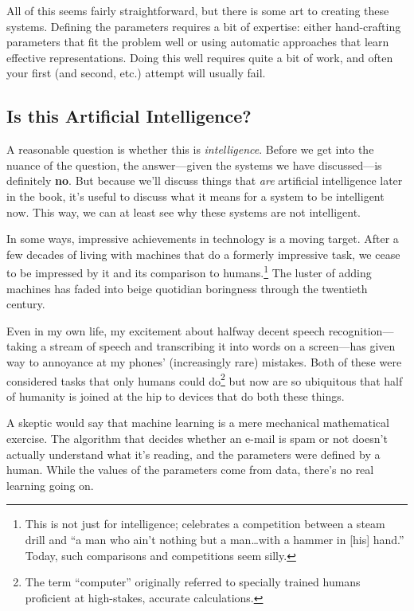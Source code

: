 All of this seems fairly straightforward, but there is some art to
creating these systems.  Defining the parameters requires a bit of
expertise: either hand-crafting parameters that fit the problem well
or using automatic approaches that learn effective representations.
Doing this well requires quite a bit of work, and often your first
(and second, etc.) attempt will usually fail.

\subsection{Is this Artificial Intelligence?}

A reasonable question is whether this is \emph{intelligence}.  Before
we get into the nuance of the question, the answer---given the systems
we have discussed---is definitely \textbf{no}.  But because we'll
discuss things that \emph{are} artificial intelligence later in the
book, it's useful to discuss what it means for a system to be
intelligent now.  This way, we can at least see why these systems are
not intelligent.

In some ways, impressive achievements in technology is a moving
target.  After a few decades of living with machines that do a
formerly impressive task, we cease to be impressed by it and its
comparison to humans.\footnote{This is not just for intelligence;
   celebrates a competition between a
  steam drill and ``a man who ain't nothing but a man\dots with a
  hammer in [his] hand.''  Today, such comparisons and competitions
  seem silly.}  The luster of adding machines has faded into beige
quotidian boringness through the twentieth century.

Even in my own life, my excitement about halfway decent speech
recognition---taking a stream of speech and transcribing it into words
on a screen---has given way to annoyance at my phones' (increasingly
rare) mistakes.  Both of these were considered tasks that only humans
could do\footnote{The term ``computer'' originally referred to
  specially trained humans proficient at high-stakes, accurate
  calculations.} but now are so ubiquitous that half of humanity is
joined at the hip to devices that do both these things.

A skeptic would say that machine learning is a mere mechanical
mathematical exercise.  The algorithm that decides whether an e-mail
is spam or not doesn't actually understand what it's reading, and the
parameters were defined by a human.  While the values of the
parameters come from data, there's no real learning going on.

